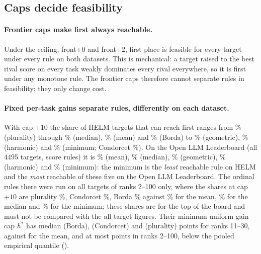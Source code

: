 \subsection{Caps decide feasibility}
\label{sec:exp-caps}

\paragraph{Frontier caps make first always reachable.}
Under the ceiling, front+0 and front+2, first place is feasible for every target under every rule on both datasets. This is mechanical: a target raised to the best rival score on every task weakly dominates every rival everywhere, so it is first under any monotone rule. The frontier caps therefore cannot separate rules in feasibility; they only change cost.

\paragraph{Fixed per-task gains separate rules, differently on each dataset.}
With cap $+10$ the share of HELM targets that can reach first ranges from \gfTenHelmPlurality\% (plurality) through \gfTenHelmMedian\% (median), \gfTenHelmMean\% (mean) and \gfTenHelmBorda\% (Borda) to \gfTenHelmGeomean\% (geometric), \gfTenHelmHarmonic\% (harmonic) and \gfTenHelmMin\% (minimum; Condorcet \gfTenHelmCondorcet\%). On the Open LLM Leaderboard (all 4495 targets, score rules) it is \gfTenOllbMean\% (mean), \gfTenOllbMedian\% (median), \gfTenOllbGeomean\% (geometric), \gfTenOllbHarmonic\% (harmonic) and \gfTenOllbMin\% (minimum): the minimum is the \emph{least} reachable rule on HELM and the \emph{most} reachable of these five on the Open LLM Leaderboard. The ordinal rules there were run on all \cvxOllbLinearN{} targets of ranks 2--100 only, where the shares at cap $+10$ are plurality \ordHundredTenPluralityFeas\%, Condorcet \ordHundredTenCondorcetFeas\%, Borda \ordHundredTenBordaFeas\% against \ordHundredTenMeanFeas\% for the mean, \ordHundredTenMedianFeas\% for the median and \ordHundredTenMinFeas\% for the minimum; these shares are for the top of the board and must not be compared with the all-target figures. Their minimum uniform gain cap $h^\ast$ has median \hstarOrdBordaElevenThirty{} (Borda), \hstarOrdCondorcetElevenThirty{} (Condorcet) and \hstarOrdPluralityElevenThirty{} (plurality) points for ranks 11--30, against \hstarBinOllbMeanElevenThirty{} for the mean, and at most \hstarOrdPluralityMax{} points in ranks 2--100, below the pooled empirical quantile (\empPooled).

